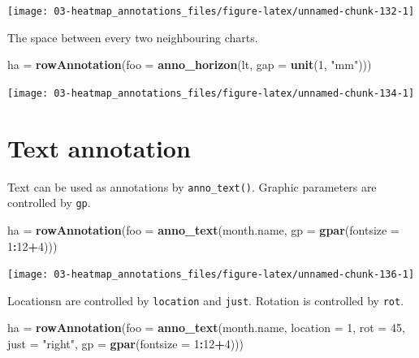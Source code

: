 \documentclass[]{book}
\newenvironment{Shaded}{\begin{snugshade}}{\end{snugshade}}
\newcommand{\KeywordTok}[1]{\textcolor[rgb]{0.13,0.29,0.53}{\textbf{#1}}}
\newcommand{\DataTypeTok}[1]{\textcolor[rgb]{0.13,0.29,0.53}{#1}}
\newcommand{\DecValTok}[1]{\textcolor[rgb]{0.00,0.00,0.81}{#1}}
\newcommand{\StringTok}[1]{\textcolor[rgb]{0.31,0.60,0.02}{#1}}
\newcommand{\OperatorTok}[1]{\textcolor[rgb]{0.81,0.36,0.00}{\textbf{#1}}}
\newcommand{\NormalTok}[1]{#1}
\theoremstyle{definition}
\theoremstyle{definition}
\theoremstyle{definition}
\theoremstyle{remark}
\begin{document}
\begin{center}\texttt{[image: 03-heatmap\_annotations\_files/figure-latex/unnamed-chunk-132-1]} \end{center}

The space between every two neighbouring charts.

\begin{Shaded}
\begin{Highlighting}[]
\NormalTok{ha =}\StringTok{ }\KeywordTok{rowAnnotation}\NormalTok{(}\DataTypeTok{foo =} \KeywordTok{anno_horizon}\NormalTok{(lt, }\DataTypeTok{gap =} \KeywordTok{unit}\NormalTok{(}\DecValTok{1}\NormalTok{, }\StringTok{"mm"}\NormalTok{)))}
\end{Highlighting}
\end{Shaded}

\begin{center}\texttt{[image: 03-heatmap\_annotations\_files/figure-latex/unnamed-chunk-134-1]} \end{center}

\section{Text annotation}\label{text-annotation}

Text can be used as annotations by \texttt{anno\_text()}. Graphic
parameters are controlled by \texttt{gp}.

\begin{Shaded}
\begin{Highlighting}[]
\NormalTok{ha =}\StringTok{ }\KeywordTok{rowAnnotation}\NormalTok{(}\DataTypeTok{foo =} \KeywordTok{anno_text}\NormalTok{(month.name, }\DataTypeTok{gp =} \KeywordTok{gpar}\NormalTok{(}\DataTypeTok{fontsize =} \DecValTok{1}\OperatorTok{:}\DecValTok{12}\OperatorTok{+}\DecValTok{4}\NormalTok{)))}
\end{Highlighting}
\end{Shaded}

\begin{center}\texttt{[image: 03-heatmap\_annotations\_files/figure-latex/unnamed-chunk-136-1]} \end{center}

Locationsn are controlled by \texttt{location} and \texttt{just}.
Rotation is controlled by \texttt{rot}.

\begin{Shaded}
\begin{Highlighting}[]
\NormalTok{ha =}\StringTok{ }\KeywordTok{rowAnnotation}\NormalTok{(}\DataTypeTok{foo =} \KeywordTok{anno_text}\NormalTok{(month.name, }\DataTypeTok{location =} \DecValTok{1}\NormalTok{, }\DataTypeTok{rot =} \DecValTok{45}\NormalTok{, }
    \DataTypeTok{just =} \StringTok{"right"}\NormalTok{, }\DataTypeTok{gp =} \KeywordTok{gpar}\NormalTok{(}\DataTypeTok{fontsize =} \DecValTok{1}\OperatorTok{:}\DecValTok{12}\OperatorTok{+}\DecValTok{4}\NormalTok{)))}
\end{Highlighting}
\end{Shaded}
\end{document}
